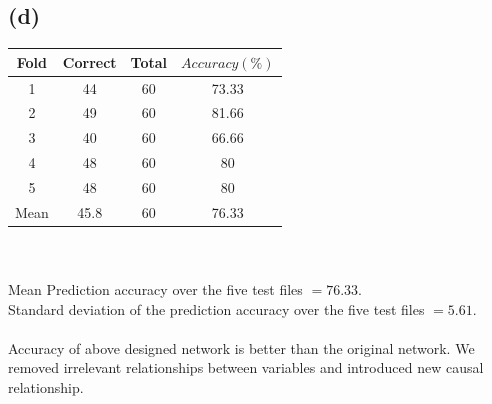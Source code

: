 \documentclass[11pt]{article} %
\begin{document}
\subsection*{(d)}
\begin{tabular}{|c|c|c|c|}\hline
Fold & Correct & Total & $Accuracy(\%)$  \\ \hline
1 & 44 & 60 & 73.33 \\ \hline
2 & 49 & 60 & 81.66 \\ \hline
3 & 40 & 60 & 66.66 \\ \hline
4 & 48 & 60 & 80 \\ \hline
5 & 48 & 60 & 80 \\ \hline
Mean & 45.8 & 60 & 76.33 \\\hline
\end{tabular}
\\ \\
Mean Prediction accuracy over the five test files $=76.33$. \\
Standard deviation of the prediction accuracy over the five test files $=5.61$. \\ \\
Accuracy of above designed network is better than the original network. We removed irrelevant relationships between variables and introduced new causal relationship. \\
\end{document}
